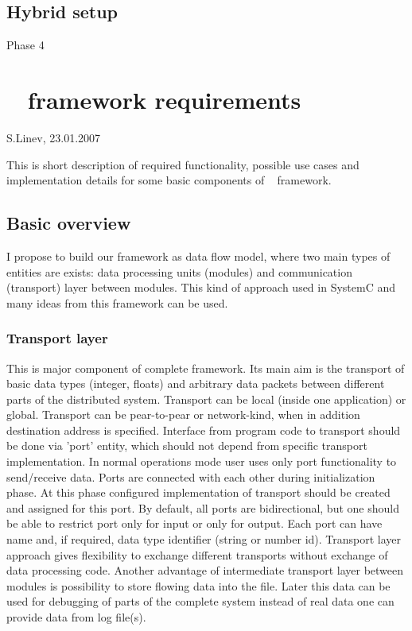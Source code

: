 \subsection{Hybrid setup}
Phase 4
\section{\dabc~ framework requirements}

S.Linev, 23.01.2007

This is short description of required functionality, possible use cases and implementation details for some basic components of \dabc~ framework.

\subsection{Basic overview}
I propose to build our framework as data flow model, where two main types of entities are exists: data processing units (modules) and communication (transport) layer between modules. This kind of approach used in SystemC and many ideas from this framework can be used.

\subsubsection{Transport layer}
This is major component of complete framework. Its main aim is the transport of basic data types (integer, floats) and arbitrary data packets between different parts of the distributed system. Transport can be local (inside one application) or global. Transport can be pear-to-pear or network-kind, when in addition destination address is specified. 
Interface from program code to transport should be done via 'port' entity, which should not depend from specific transport implementation. In normal operations mode user uses only port functionality to send/receive data. 
Ports are connected with each other during initialization phase. At this phase configured implementation of transport should be created and assigned for this port. 
By default, all ports are bidirectional, but one should be able to restrict port only for input or only for output. Each port can have name and, if required, data type identifier (string or number id). 
Transport layer approach gives flexibility to exchange different transports without exchange of data processing code.
Another advantage of intermediate transport layer between modules is possibility to store flowing data into the file. Later this data can be used for debugging of parts of the complete system instead of real data one can provide data from log file(s). 

